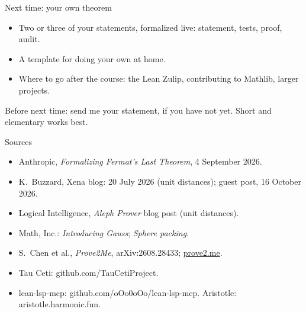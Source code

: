 \documentclass[10pt, aspectratio=169]{beamer}
\begin{document}
\begin{frame}[fragile]{Next time: your own theorem}
\begin{itemize}
\item Two or three of your statements, formalized live: statement, tests, proof, audit.
\item A template for doing your own at home.
\item Where to go after the course: the Lean Zulip, contributing to Mathlib, larger projects.
\end{itemize}

\vspace{1em}
\begin{keypoint}
\normalsize Before next time: send me your statement, if you have not yet. Short and elementary works best.
\end{keypoint}
\end{frame}

\begin{frame}[fragile]{Sources}
\small
\begin{itemize}
\item Anthropic, \emph{Formalizing Fermat's Last Theorem}, 4 September 2026.
\item K.\ Buzzard, Xena blog: 20 July 2026 (unit distances); guest post, 16 October 2026.
\item Logical Intelligence, \emph{Aleph Prover} blog post (unit distances).
\item Math, Inc.: \emph{Introducing Gauss}; \emph{Sphere packing}.
\item S.\ Chen et al., \emph{Prove2Me}, arXiv:2608.28433; \href{https://prove2.me}{prove2.me}.
\item Tau Ceti: github.com/TauCetiProject.
\item lean-lsp-mcp: github.com/oOo0oOo/lean-lsp-mcp. Aristotle: aristotle.harmonic.fun.
\end{itemize}
\end{frame}
\end{document}
